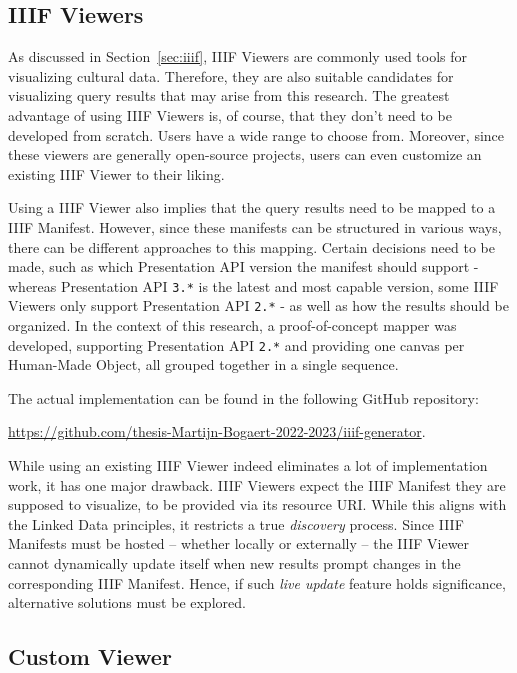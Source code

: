 \subsection{IIIF Viewers}
\label{subsec:visualizing_query_results_iiif_viewers}

As discussed in Section~\ref{sec:iiif}, IIIF Viewers are commonly used tools for visualizing cultural data. Therefore, they are also suitable candidates for visualizing query results that may arise from this research. The greatest advantage of using IIIF Viewers is, of course, that they don't need to be developed from scratch. Users have a wide range to choose from. Moreover, since these viewers are generally open-source projects, users can even customize an existing IIIF Viewer to their liking.

Using a IIIF Viewer also implies that the query results need to be mapped to a IIIF Manifest. However, since these manifests can be structured in various ways, there can be different approaches to this mapping. Certain decisions need to be made, such as which Presentation API version the manifest should support - whereas Presentation API \texttt{3.*} is the latest and most capable version, some IIIF Viewers only support Presentation API \texttt{2.*} - as well as how the results should be organized. In the context of this research, a proof-of-concept mapper was developed, supporting Presentation API \texttt{2.*} and providing one canvas per Human-Made Object, all grouped together in a single sequence.

The actual implementation can be found in the following GitHub repository:
\begin{center}
    \url{https://github.com/thesis-Martijn-Bogaert-2022-2023/iiif-generator}.
\end{center}

While using an existing IIIF Viewer indeed eliminates a lot of implementation work, it has one major drawback. IIIF Viewers expect the IIIF Manifest they are supposed to visualize, to be provided via its resource URI. While this aligns with the Linked Data principles, it restricts a true \textit{discovery} process. Since IIIF Manifests must be hosted – whether locally or externally – the IIIF Viewer cannot dynamically update itself when new results prompt changes in the corresponding IIIF Manifest. Hence, if such \textit{live update} feature holds significance, alternative solutions must be explored.

\subsection{Custom Viewer}
\label{subsec:visualizing_query_results_custom_viewer}

